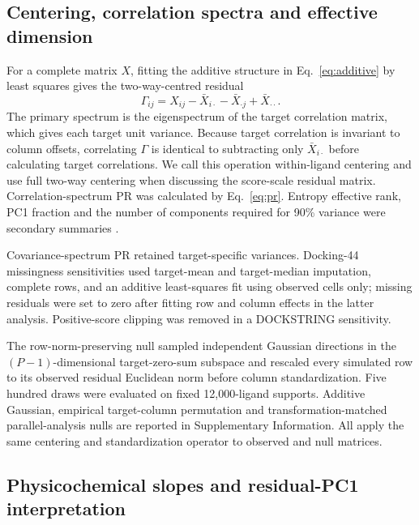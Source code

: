 \documentclass[11pt]{article}
\begin{document}
\subsection{Centering, correlation spectra and effective dimension}

For a complete matrix $X$, fitting the additive structure in Eq.~\ref{eq:additive} by least
squares gives the two-way-centred residual
\begin{equation}
\Gamma_{ij}=X_{ij}-\bar X_{i\cdot}-\bar X_{\cdot j}+\bar X_{\cdot\cdot}.
\label{eq:twoway}
\end{equation}
The primary spectrum is the eigenspectrum of the target correlation matrix, which gives each
target unit variance. Because target correlation is invariant to column offsets, correlating
$\Gamma$ is identical to subtracting only $\bar X_{i\cdot}$ before calculating target
correlations. We call this operation within-ligand centering and use full two-way centering
when discussing the score-scale residual matrix. Correlation-spectrum PR was calculated by
Eq.~\ref{eq:pr}. Entropy effective rank, PC1 fraction and the number of components required
for 90\% variance were secondary summaries \cite{mazzucato2016,roy2007}.

Covariance-spectrum PR retained target-specific variances. Docking-44 missingness
sensitivities used target-mean and target-median imputation, complete rows, and an additive
least-squares fit using observed cells only; missing residuals were set to zero after fitting
row and column effects in the latter analysis. Positive-score clipping was removed in a
DOCKSTRING sensitivity.

The row-norm-preserving null sampled independent Gaussian directions in the
$(P-1)$-dimensional target-zero-sum subspace and rescaled every simulated row to its observed
residual Euclidean norm before column standardization. Five hundred draws were evaluated on
fixed 12,000-ligand supports. Additive Gaussian, empirical target-column permutation and
transformation-matched parallel-analysis nulls are reported in Supplementary Information.
All apply the same centering and standardization operator to observed and null matrices.

\subsection{Physicochemical slopes and residual-PC1 interpretation}
\end{document}
